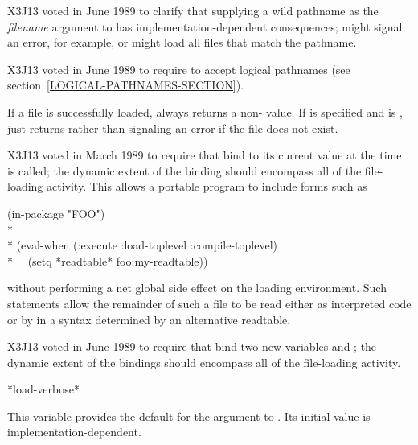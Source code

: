 \begin{defun}[Function]
\begin{newer}
X3J13 voted in June 1989 
to clarify that supplying a wild pathname
as the {\it filename} argument to  has implementation-dependent consequences;
 might signal an error, for example,
or might load all files that match the pathname.
\end{newer}

\begin{newer}
X3J13 voted in June 1989  to require 
to accept logical pathnames (see section~\ref{LOGICAL-PATHNAMES-SECTION}).
\end{newer}

If a file is successfully loaded,  always returns a non-{\false}
value.  If  is specified and is {\false},
 just returns {\false} rather than signaling an error if the file
does not exist.

\begin{newer}
X3J13 voted in March 1989 
to require that  bind  to its current value
at the time  is called; the dynamic extent of the binding
should encompass all of the file-loading activity.
This allows a portable program to include forms such as
\begin{lisp}
(in-package "FOO") \\*
\\*
(eval-when (:execute :load-toplevel :compile-toplevel) \\*
~~(setq *readtable* foo:my-readtable))
\end{lisp}
without performing a net global side effect on the loading environment.
Such statements allow the remainder of such a file to be read either as
interpreted code or by  in a syntax determined by
an alternative readtable.
\end{newer}

\begin{newer}
X3J13 voted in June 1989 
to require that  bind two new variables
 and ; the dynamic extent of the bindings
should encompass all of the file-loading activity.
\end{newer}
\end{defun}

\begin{defun}[Variable]
*load-verbose*

This variable provides the default for the  argument
to .  Its initial value is implementation-dependent.
\end{defun}


